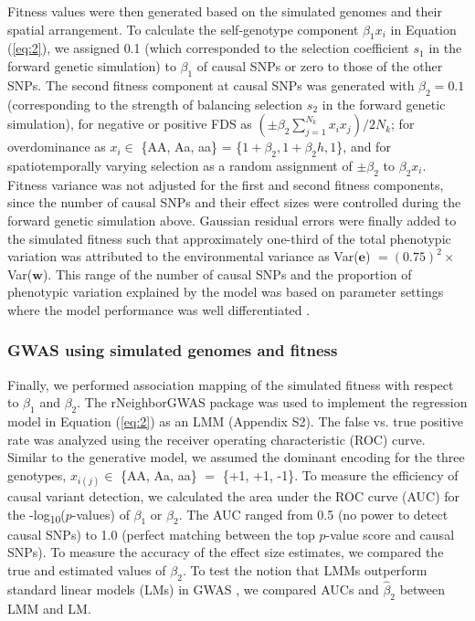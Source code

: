 \documentclass[12pt,]{article}
\begin{document}
Fitness values were then generated based on the simulated genomes and their spatial arrangement. To calculate the self-genotype component $\beta_1x_i$ in Equation (\ref{eq:2}), we assigned 0.1 (which corresponded to the selection coefficient $s_1$ in the forward genetic simulation) to $\beta_1$ of causal SNPs or zero to those of the other SNPs. The second fitness component at causal SNPs was generated with $\beta_2 = 0.1$ (corresponding to the strength of balancing selection $s_2$ in the forward genetic simulation), for negative or positive FDS as $(\pm \beta_2\sum^{N_{k}}_{j=1}{x_ix_j}) / 2N_k$; for overdominance as $x_i \in$ \{AA, Aa, aa\} = \{$1+\beta_2, 1+\beta_2h, 1$\}, and for spatiotemporally varying selection as a random assignment of $\pm \beta_2$ to $\beta_2x_i$. Fitness variance was not adjusted for the first and second fitness components, since the number of causal SNPs and their effect sizes were controlled during the forward genetic simulation above. Gaussian residual errors were finally added to the simulated fitness such that approximately one-third of the total phenotypic variation was attributed to the environmental variance as Var($\mathbf{e}$) $=(0.75)^2 \times$Var($\mathbf{w}$). This range of the number of causal SNPs and the proportion of phenotypic variation explained by the model was based on parameter settings where the model performance was well differentiated \citep{sato2019neighbor}.

\subsubsection{GWAS using simulated genomes and fitness}
Finally, we performed association mapping of the simulated fitness with respect to $\beta_1$ and $\beta_2$. The rNeighborGWAS package \citep{sato2019neighbor} was used to implement the regression model in Equation (\ref{eq:2}) as an LMM (Appendix S2). The false vs. true positive rate was analyzed using the receiver operating characteristic (ROC) curve. Similar to the generative model, we assumed the dominant encoding for the three genotypes, $x_{i(j)} \in$ \{AA, Aa, aa\} $=$ \{+1, +1, -1\}. To measure the efficiency of causal variant detection, we calculated the area under the ROC curve (AUC) for the -log\textsubscript{10}($p$-values) of $\beta_1$ or $\beta_2$. The AUC ranged from 0.5 (no power to detect causal SNPs) to 1.0 (perfect matching between the top $p$-value score and causal SNPs). To measure the accuracy of the effect size estimates, we compared the true and estimated values of $\beta_2$. To test the notion that LMMs outperform standard linear models (LMs) in GWAS \citep{kang2008efficient}, we compared AUCs and $\hat{\beta}_2$ between LMM and LM.
\end{document}
